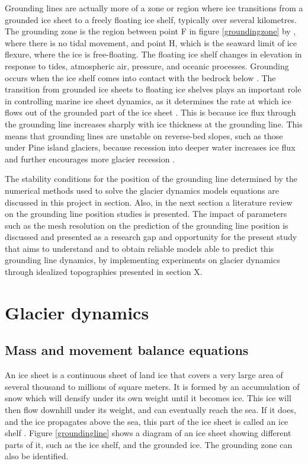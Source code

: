 \documentclass{article}
\begin{document}
Grounding lines are actually more of a zone or region where ice transitions from a grounded ice sheet to a freely floating ice shelf, typically over several kilometres. The grounding zone is the region between point F in figure \ref{groundingzone} by \cite{fricker2009mapping}, where there is no tidal movement, and point H, which is the seaward limit of ice flexure, where the ice is free-floating. The floating ice shelf changes in elevation in response to tides, atmospheric air, pressure, and oceanic processes. Grounding occurs when the ice shelf comes into contact with the bedrock below \cite{fricker2009mapping}. The transition from grounded ice sheets to floating ice shelves plays an important role in controlling marine ice sheet dynamics, as it determines the rate at which ice flows out of the grounded part of the ice sheet \cite{schoof2007ice}. This is because ice flux through the grounding line increases sharply with ice thickness at the grounding line. This means that grounding lines are unstable on reverse-bed slopes, such as those under Pine island glaciers, because recession into deeper water increases ice flux and further encourages more glacier recession \cite{schoof2007marine}.

The stability conditions for the position of the grounding line determined by the numerical methods used to solve the glacier dynamics models equations are discussed in this project in section. Also, in the next section a literature review on the grounding line position studies is presented. The impact of parameters such as the mesh resolution on the prediction of the grounding line position is discussed and presented as a research gap and opportunity for the present study that aims to understand and to obtain reliable models able to predict this grounding line dynamics, by implementing experiments on glacier dynamics through idealized topographies presented in section X. 

 \section{Glacier dynamics}
 \subsection{Mass and movement balance equations}
An ice sheet is a continuous sheet of land ice that covers a very large area of several thousand to millions of square meters. It is formed by an accumulation of snow which will densify under its own weight until it becomes ice. This ice will then flow downhill under its weight, and can eventually reach the sea. If it does, and the ice propagates above the sea, this part of the ice sheet is called an ice shelf \cite{hutter1982mathematical}. Figure \ref{groundingline} shows a diagram of an ice sheet showing different parts of it, such as the ice shelf, and the grounded ice. The grounding zone can also be identified. 
\end{document}
